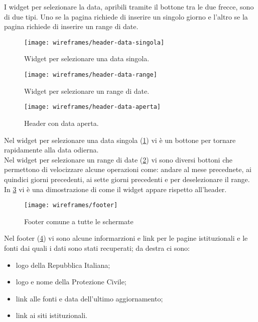 I widget per selezionare la data, apribili tramite il bottone tra le due frecce, sono di due tipi. Uno se la pagina richiede  di inserire un singolo giorno e l'altro se la pagina richiede di inserire  un range di date.\\

\begin{figure}[H]
    \centering
    \texttt{[image: wireframes/header-data-singola]}
    \caption{Widget per selezionare una data singola.}
    \label{fig:header-data-singola}
\end{figure}

\begin{figure}[H]
    \centering
    \texttt{[image: wireframes/header-data-range]}
    \caption{Widget per selezionare un range di date.}
    \label{fig:header-data-range}
\end{figure}

\begin{figure}[H]
    \centering
    \texttt{[image: wireframes/header-data-aperta]}
    \caption{Header con data aperta.}
    \label{fig:header-data-aperta}
\end{figure}

Nel widget per selezionare una data singola (\ref{fig:header-data-singola}) vi è un bottone per tornare rapidamente alla data odierna.\\
Nel widget per selezionare un range di date (\ref{fig:header-data-range}) vi sono diversi bottoni che permettono di velocizzare alcune operazioni come: andare al mese precednete, ai quindici giorni precedenti, ai sette giorni precedenti e per deselezionare il range.\\
In \ref{fig:header-data-aperta} vi è una dimostrazione di come il widget appare rispetto all'header.

\begin{figure}[H]
    \centering
    \texttt{[image: wireframes/footer]}
    \caption{Footer comune a tutte le schermate}
    \label{fig:footer}
\end{figure}

Nel footer (\ref{fig:footer}) vi sono alcune informarzioni e link per le pagine istituzionali e le fonti dai quali i dati sono stati recuperati; da destra ci sono:
\begin{itemize}
    \item logo della Repubblica Italiana;
    \item logo e nome della Protezione Civile;
    \item link alle fonti e data dell'ultimo aggiornamento;
    \item link ai siti istituzionali.
\end{itemize}

